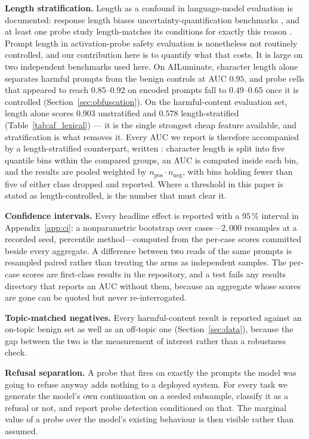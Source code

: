 \textbf{Length stratification.} Length as a confound in language-model evaluation is documented: response length
biases uncertainty-quantification benchmarks \cite{lengthconfound2025a}, and at least one probe study length-matches
its conditions for exactly this reason \cite{evalawareness2026}. Prompt length in activation-probe safety evaluation is nonetheless
not routinely controlled, and our contribution here is to quantify what that costs. It is large on two independent
benchmarks used here. On AILuminate, character length alone separates harmful prompts from
the benign controls at AUC $0.95$, and probe cells that appeared to reach $0.85$--$0.92$ on encoded prompts fall to
$0.49$--$0.65$ once it is controlled (Section~\ref{sec:obfuscation}). On the harmful-content evaluation set, length
alone scores $0.903$ unstratified and $0.578$ length-stratified (Table~\ref{tab:af_lexical}) --- it is the single
strongest cheap feature available, and stratification is what removes it.
Every AUC we report is therefore accompanied by a length-stratified counterpart, written \aucstar{}: character length
is split into five quantile bins within the compared groups, an AUC is computed inside each bin, and the results are
pooled weighted by $n_{\text{pos}} \cdot n_{\text{neg}}$, with bins holding fewer than five of either class dropped
and reported. Where a threshold in this paper is stated as length-controlled, \aucstar{} is the number that must clear
it.

\textbf{Confidence intervals.} Every headline effect is reported with a $95\,\%$ interval in
Appendix~\ref{app:ci}: a nonparametric bootstrap over cases---$2{,}000$ resamples at a recorded seed, percentile
method---computed from the per-case scores committed beside every aggregate. A difference between two reads of the
same prompts is resampled paired rather than treating the arms as independent samples. The per-case scores are
first-class results in the repository, and a test fails any results directory that reports an AUC without them,
because an aggregate whose scores are gone can be quoted but never re-interrogated.

\textbf{Topic-matched negatives.} Every harmful-content result is reported against an on-topic benign set as well as
an off-topic one (Section~\ref{sec:data}), because the gap between the two is the measurement of interest rather than
a robustness check.

\textbf{Refusal separation.} A probe that fires on exactly the prompts the model was going to refuse anyway adds
nothing to a deployed system. For every task we generate the model's own continuation on a seeded subsample, classify
it as a refusal or not, and report probe detection conditioned on that. The marginal value of a probe over the
model's existing behaviour is then visible rather than assumed.

